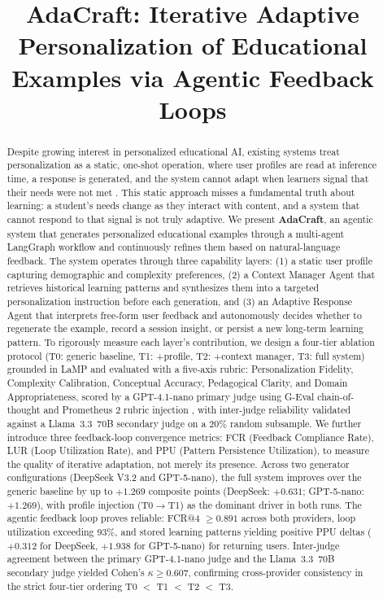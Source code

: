 \documentclass[conference]{IEEEtran}
\begin{document}
\title{AdaCraft: Iterative Adaptive Personalization of Educational Examples via Agentic Feedback Loops}

\author{}

\maketitle

\begin{abstract}
Despite growing interest in personalized educational AI, existing systems treat personalization as a static, one-shot operation, where user profiles are read at inference time, a response is generated, and the system cannot adapt when learners signal that their needs were not met \cite{b1, b2}. This static approach misses a fundamental truth about learning: a student's needs change as they interact with content, and a system that cannot respond to that signal is not truly adaptive. We present \textbf{AdaCraft}, an agentic system that generates personalized educational examples through a multi-agent LangGraph workflow and continuously refines them based on natural-language feedback. The system operates through three capability layers: (1) a static user profile capturing demographic and complexity preferences, (2) a Context Manager Agent that retrieves historical learning patterns and synthesizes them into a targeted personalization instruction before each generation, and (3) an Adaptive Response Agent that interprets free-form user feedback and autonomously decides whether to regenerate the example, record a session insight, or persist a new long-term learning pattern. To rigorously measure each layer's contribution, we design a four-tier ablation protocol (T0: generic baseline, T1: +profile, T2: +context manager, T3: full system) grounded in LaMP \cite{b3} and evaluated with a five-axis rubric: Personalization Fidelity, Complexity Calibration, Conceptual Accuracy, Pedagogical Clarity, and Domain Appropriateness, scored by a GPT-4.1-nano primary judge using G-Eval chain-of-thought \cite{b4} and Prometheus 2 rubric injection \cite{b5}, with inter-judge reliability validated against a Llama~3.3~70B secondary judge on a 20\% random subsample. We further introduce three feedback-loop convergence metrics: FCR (Feedback Compliance Rate), LUR (Loop Utilization Rate), and PPU (Pattern Persistence Utilization), to measure the quality of iterative adaptation, not merely its presence. Across two generator configurations (DeepSeek V3.2 and GPT-5-nano), the full system improves over the generic baseline by up to $+1.269$ composite points (DeepSeek: $+0.631$; GPT-5-nano: $+1.269$), with profile injection (T0$\to$T1) as the dominant driver in both runs. The agentic feedback loop proves reliable: FCR@4 $\geq 0.891$ across both providers, loop utilization exceeding 93\%, and stored learning patterns yielding positive PPU deltas ($+0.312$ for DeepSeek, $+1.938$ for GPT-5-nano) for returning users. Inter-judge agreement between the primary GPT-4.1-nano judge and the Llama~3.3~70B secondary judge yielded Cohen's $\kappa \geq 0.607$, confirming cross-provider consistency in the strict four-tier ordering T0 $<$ T1 $<$ T2 $<$ T3. 


\end{abstract}
\end{document}
